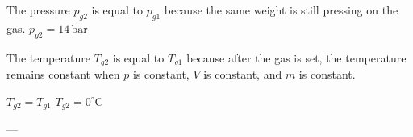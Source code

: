 The pressure \( p_{g2} \) is equal to \( p_{g1} \) because the same weight is still pressing on the gas.  
\( p_{g2} = 14 \, \text{bar} \)  

The temperature \( T_{g2} \) is equal to \( T_{g1} \) because after the gas is set, the temperature remains constant when \( p \) is constant, \( V \) is constant, and \( m \) is constant.  

\( T_{g2} = T_{g1} \)  
\( T_{g2} = 0^\circ \text{C} \)  

---
